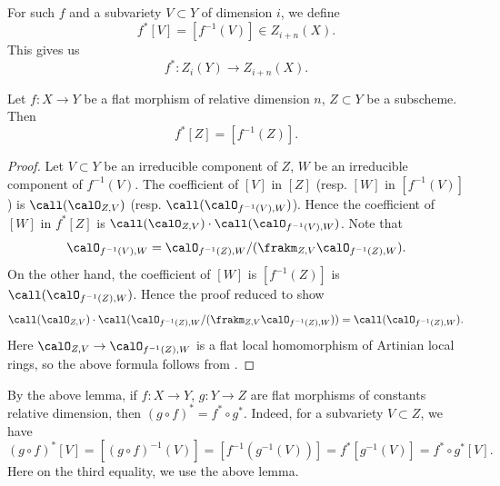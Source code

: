     For such \(f\) and a subvariety \(V \subset Y\) of dimension \(i\),
    we define 
    \[ f^*[V] = [f^{-1}(V)] \in Z_{i+n}(X). \]
    This gives us 
    \[ f^* : Z_i(Y) \to Z_{i+n}(X). \]

    \begin{lemma}\label{lem:flat_pullback_of_scheme_is_inverse_image}
        Let \(f: X \to Y\) be a flat morphism of relative dimension \(n\), 
        \(Z \subset Y\) be a subscheme.
        Then 
        \[ f^*[Z] = [f^{-1}(Z)]. \]
    \end{lemma}
    \begin{proof}
        Let \(V \subset Y\) be an irreducible component of \(Z\), \(W\) be an irreducible component of \(f^{-1}(V)\).
        The coefficient of \([V]\) in \([Z]\) (resp. $[W]$ in $[f^{-1}(V)]$) is \(\call(\calO_{Z,V})\) (resp. $\call(\calO_{f^{-1}(V),W})$).
        Hence the coefficient of \([W]\) in \(f^*[Z]\) is $\call(\calO_{Z,V}) \cdot \call(\calO_{f^{-1}(V),W})$.
        Note that 
        \[ \calO_{f^{-1}(V),W} = \calO_{f^{-1}(Z),W}/(\frakm_{Z,V}\calO_{f^{-1}(Z),W}). \]
        On the other hand, the coefficient of \([W]\) is \([f^{-1}(Z)]\) is $\call(\calO_{f^{-1}(Z),W})$.
        Hence the proof reduced to show 
        \[ \call(\calO_{Z,V}) \cdot \call(\calO_{f^{-1}(Z),W}/(\frakm_{Z,V}\calO_{f^{-1}(Z),W})) = \call(\calO_{f^{-1}(Z),W}). \]
        Here $\calO_{Z,V} \to \calO_{f^{-1}(Z),W}$ is a flat local homomorphism of Artinian local rings, so the above formula follows from \cite[A.4.1]{Fulton13Intersection}.
    \end{proof}

    By the above lemma, if \(f: X \to Y\), \(g: Y \to Z\) are flat morphisms of constants relative dimension, 
    then \((g\circ f)^* = f^* \circ g^*\).
    Indeed, for a subvariety \(V \subset Z\), we have
    \[ (g\circ f)^*[V] = [(g\circ f)^{-1}(V)] = [f^{-1}(g^{-1}(V))] = f^*[g^{-1}(V)] = f^* \circ g^*[V]. \]
    Here on the third equality, we use the above lemma. 

